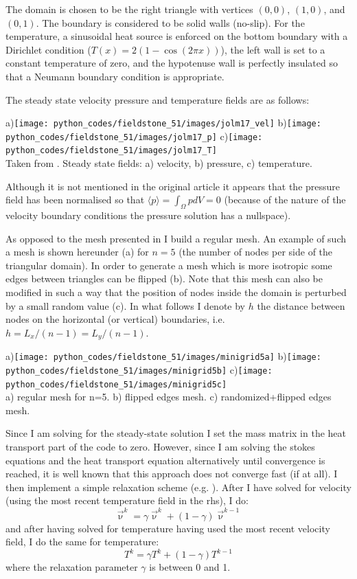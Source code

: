 The domain is chosen to be the right triangle
with vertices $(0,0)$, $(1,0)$, and $(0,1)$. 
The boundary is considered to be solid walls (no-slip).
For the temperature, a sinusoidal heat source is enforced on the bottom
boundary with a Dirichlet condition ($T(x)=2(1-\cos (2\pi x))$), 
the left wall is set to a constant temperature
of zero, and the hypotenuse wall is perfectly insulated so that a Neumann 
boundary condition is appropriate.

The steady state velocity pressure and temperature fields are as follows:

\begin{center}
a)\texttt{[image: python\_codes/fieldstone\_51/images/jolm17\_vel]}
b)\texttt{[image: python\_codes/fieldstone\_51/images/jolm17\_p]}
c)\texttt{[image: python\_codes/fieldstone\_51/images/jolm17\_T]}\\
{\captionfont Taken from \cite{jolm17}. Steady state fields: a) velocity, b) pressure, c) temperature.}
\end{center}

Although it is not mentioned in the original article it appears that the 
pressure field has been normalised so that $\langle p \rangle = \int_\Omega p dV=0$
(because of the nature of the velocity boundary conditions the pressure 
solution has a nullspace).

As opposed to the mesh presented in \cite{jolm17} I build a regular mesh.
An example of such a mesh is shown hereunder (a) for $n=5$ (the number of nodes
per side of the triangular domain). 
In order to generate a mesh which is more isotropic some edges between 
triangles can be flipped (b). 
Note that this mesh can also be modified in such a way that the position of 
nodes inside the domain is perturbed by a small random value (c).
In what follows I denote by $h$ the distance between nodes
on the horizontal (or vertical) boundaries, i.e. $h=L_x/(n-1)=L_y/(n-1)$.
\begin{center}
a)\texttt{[image: python\_codes/fieldstone\_51/images/minigrid5a]}
b)\texttt{[image: python\_codes/fieldstone\_51/images/minigrid5b]}
c)\texttt{[image: python\_codes/fieldstone\_51/images/minigrid5c]}\\
{\small a) regular mesh for n=5. b) flipped edges mesh. c) randomized+flipped edges mesh.}
\end{center}

Since I am solving for the steady-state solution I set the mass matrix in the 
heat transport part of the code to zero. However, since I am solving the stokes equations
and the heat transport equation alternatively until convergence is reached, it is well 
known that this approach does not converge fast (if at all). 
I then implement a simple relaxation scheme (e.g. \textcite{vyrc13}). After I have solved for velocity (using the 
most recent temperature field in the rhs), I do:
\[
\vec{\upnu}^k = \gamma \vec{\upnu}^k + (1-\gamma) \vec{\upnu}^{k-1}
\]
and after having solved for temperature having used the most recent velocity field, 
I do the same for temperature:
\[
{T}^k = \gamma {T}^k + (1-\gamma) {T}^{k-1}
\]
where the relaxation parameter $\gamma$ is between 0 and 1.




